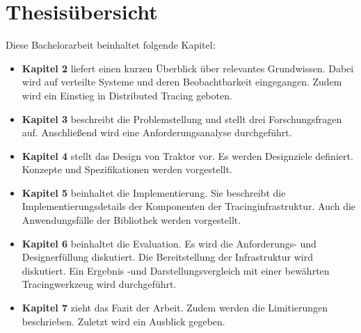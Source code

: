 \section{Thesisübersicht}
\label{section:Thesisübersicht}

Diese Bachelorarbeit beinhaltet folgende Kapitel:

\begin{itemize}
	\item \textbf{Kapitel 2} liefert einen kurzen Überblick über relevantes Grundwissen. Dabei wird auf verteilte Systeme und deren Beobachtbarkeit eingegangen. Zudem wird ein Einstieg in Distributed Tracing geboten.
	\item \textbf{Kapitel 3} beschreibt die Problemstellung und stellt drei Forschungsfragen auf. Anschließend wird eine Anforderungsanalyse durchgeführt.
	\item \textbf{Kapitel 4} stellt das Design von Traktor vor. Es werden Designziele definiert. Konzepte und Spezifikationen werden vorgestellt. 
	\item \textbf{Kapitel 5} beinhaltet die Implementierung. Sie beschreibt die Implementierungsdetails der Komponenten der Tracinginfrastruktur. Auch die Anwendungsfälle der Bibliothek werden vorgestellt.
	\item \textbf{Kapitel 6} beinhaltet die Evaluation. Es wird die Anforderungs- und Designerfüllung diskutiert. Die Bereitstellung der Infrastruktur wird diskutiert. Ein Ergebnis -und Darstellungsvergleich mit einer bewährten Tracingwerkzeug wird durchgeführt.
	\item \textbf{Kapitel 7} zieht das Fazit der Arbeit. Zudem werden die Limitierungen beschrieben. Zuletzt wird ein  Ausblick gegeben.
\end{itemize}
